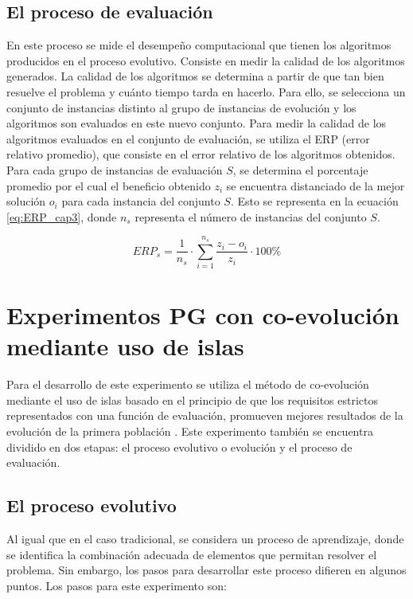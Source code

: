 \subsection{El proceso de evaluación}
En este proceso se mide el desempeño computacional que tienen los algoritmos producidos en el proceso evolutivo. Consiste en medir la calidad de los algoritmos generados. La calidad de los algoritmos se determina a partir de que tan bien resuelve el problema y cuánto tiempo tarda en hacerlo. Para ello, se selecciona un conjunto de instancias distinto al grupo de instancias de evolución y los algoritmos son evaluados en este nuevo conjunto. Para medir la calidad de los algoritmos evaluados en el conjunto de evaluación, se utiliza el ERP (error relativo promedio), que consiste en el error relativo de los algoritmos obtenidos. Para cada grupo de instancias de evaluación $S$, se determina el porcentaje promedio por el cual el beneficio obtenido $z_{i}$ se encuentra distanciado de la mejor solución $o_{i}$ para cada instancia del conjunto $S$. Esto se representa en la ecuación \ref{eq:ERP_cap3}, donde $n_{s}$ representa el número de instancias del conjunto $S$.

\begin{equation}
  \label{eq:ERP_cap3}
  ERP_{s} =  \frac{1}{n_{s}} \cdot \sum\limits_{i=1}^{n_{s}} \frac{z_{i} - o_{i}}{z_{i}} \cdot 100\%
\end{equation}

\section{Experimentos PG con co-evolución mediante uso de islas}\label{cap:experimento_islas}
Para el desarrollo de este experimento se utiliza el método de co-evolución mediante el uso de islas basado en el principio de que los requisitos estrictos representados con una función de evaluación, promueven mejores resultados de la evolución de la primera población \citep{shang_2014}. Este experimento también se encuentra dividido en dos etapas: el proceso evolutivo o evolución y el proceso de evaluación.

\subsection{El proceso evolutivo}
Al igual que en el caso tradicional, se considera un proceso de aprendizaje, donde se identifica la combinación adecuada de elementos que permitan resolver el problema. Sin embargo, los pasos para desarrollar este proceso difieren en algunos puntos. Los pasos para este experimento son:

